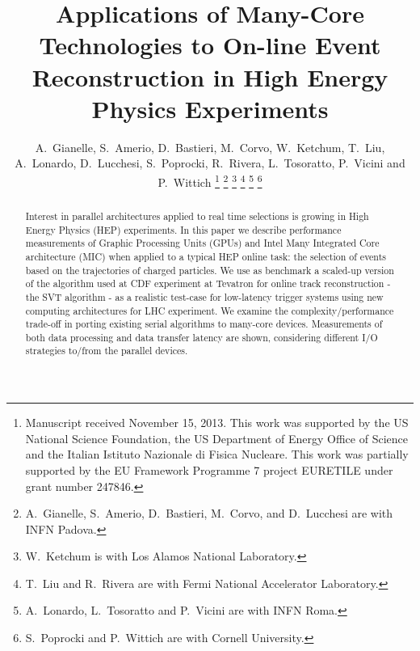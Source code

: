 \documentclass[journal]{IEEEtran}
\begin{document}
\title{Applications of Many-Core Technologies to On-line Event Reconstruction in High Energy Physics
Experiments}
\author{A.~Gianelle, 
  S.~Amerio, 
  D.~Bastieri, 
  M.~Corvo, 
  W.~Ketchum,
  T.~Liu, 
  A.~Lonardo, 
  D.~Lucchesi,
  S.~Poprocki, 
  R.~Rivera, 
  L.~Tosoratto,
  P.~Vicini
  and 
  P.~Wittich
\thanks{Manuscript received November 15, 2013.
This work was supported by the  US National Science Foundation, the US 
Department of Energy Office of Science and the Italian
Istituto Nazionale di Fisica Nucleare. This work was partially supported by the 
EU Framework Programme 7 project EURETILE under grant number 247846.}%
\thanks{A.~Gianelle, S.~Amerio, D.~Bastieri, M.~Corvo, and D.~Lucchesi are with INFN Padova.}%
\thanks{W.~Ketchum is with Los Alamos National Laboratory.}%
\thanks{T.~Liu and R.~Rivera are with Fermi National Accelerator Laboratory.}%
\thanks{A.~Lonardo, L.~Tosoratto and P.~Vicini are with INFN Roma.}%
\thanks{S.~Poprocki and P.~Wittich are with Cornell University.}
}
\maketitle
\thispagestyle{empty}
\begin{abstract}
  Interest in parallel architectures applied to real time selections is 
  growing in High Energy Physics (HEP) experiments. In this paper we describe
  performance measurements of Graphic Processing Units (GPUs) and Intel Many
  Integrated Core architecture (MIC) when applied to a typical HEP online task: 
  the selection of events based on the trajectories of charged particles.
  We use as benchmark a scaled-up version of the algorithm used at CDF 
  experiment at Tevatron for online track reconstruction - the SVT algorithm - 
  as a realistic  test-case for low-latency trigger systems using new computing
  architectures for LHC experiment. We examine the
  complexity/performance trade-off in porting existing serial
  algorithms to many-core devices. Measurements of both data processing 
  and data transfer latency are shown, considering different I/O strategies 
  to/from the parallel devices. \end{abstract}
\end{document}
